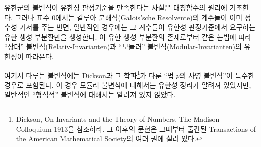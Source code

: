 \documentclass[11pt]{article}
\begin{document}
유한군의 불변식이 유한성 판정기준을 만족한다는 사실은 대칭함수의 원리에 기초한다. 그러나 표수 0에서는 갈루아 분해식(Galois'sche Resolvente)의 계수들이 이미 정수성 기저를 주는 반면, 일반적인 경우에는 그 계수들이 유한성 판정기준에서 요구하는 유한 생성 부분환만을 생성한다. 이 유한 생성 부분환의 존재로부터 같은 논법에 따라 ``상대'' 불변식(Relativ-Invarianten)과 ``모듈러'' 불변식(Modular-Invarianten)의 유한성이 따라온다.

여기서 다루는 불변식에는 Dickson과 그 학파\footnote{Dickson, On Invariants and the Theory of Numbers. The Madison Colloquium 1913을 참조하라. 그 이후의 문헌은 그때부터 출간된 Transactions of the American Mathematical Society의 여러 권에 실려 있다.}가 다룬 ``법 $p$의 사영 불변식''이 특수한 경우로 포함된다. 이 경우 모듈러 불변식에 대해서는 유한성 정리가 알려져 있었지만, 일반적인 ``형식적'' 불변식에 대해서는 알려져 있지 않았다.
\end{document}

